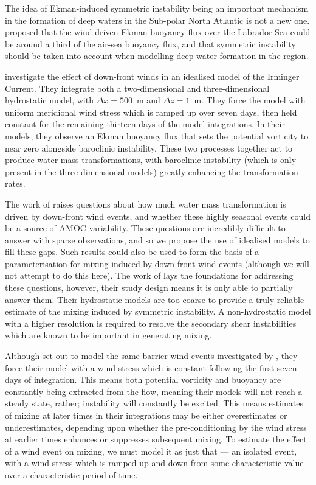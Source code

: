 The idea of Ekman-induced symmetric instability being an important mechanism in the formation of deep waters in the Sub-polar North Atlantic is not a new one. \citet{Straneo2002} proposed that the wind-driven Ekman buoyancy flux over the Labrador Sea could be around a third of the air-sea buoyancy flux, and that symmetric instability should be taken into account when modelling deep water formation in the region. 

\citet{Spall2016} investigate the effect of down-front winds in an idealised model of the Irminger Current. They integrate both a two-dimensional and three-dimensional hydrostatic model, with $\Delta x = 500$~m and $\Delta z = 1$~m. They force the model with uniform meridional wind stress which is ramped up over seven days, then held constant for the remaining thirteen days of the model integrations. In their models, they observe an Ekman buoyancy flux that sets the potential vorticity to near zero alongside baroclinic instability. These two processes together act to produce water mass transformations, with baroclinic instability (which is only present in the three-dimensional models) greatly enhancing the transformation rates.

The work of \citet{LeBras2022} raises questions about how much water mass transformation is driven by down-front wind events, and whether these highly seasonal events could be a source of AMOC variability. These questions are incredibly difficult to answer with sparse observations, and so we propose the use of idealised models to fill these gaps. Such results could also be used to form the basis of a parameterisation for mixing induced by down-front wind events (although we will not attempt to do this here). The work of \citet{Spall2016} lays the foundations for addressing these questions, however, their study design means it is only able to partially answer them. Their hydrostatic models are too coarse to provide a truly reliable estimate of the mixing induced by symmetric instability. A non-hydrostatic model with a higher resolution is required to resolve the secondary shear instabilities which are known to be important in generating mixing.

Although \citet{Spall2016} set out to model the same barrier wind events investigated by \citet{LeBras2022}, they force their model with a wind stress which is constant following the first seven days of integration. This means both potential vorticity and buoyancy are constantly being extracted from the flow, meaning their models will not reach a steady state, rather; instability will constantly be excited. This means estimates of mixing at later times in their integrations may be either overestimates or underestimates, depending upon whether the pre-conditioning by the wind stress at earlier times enhances or suppresses subsequent mixing. To estimate the effect of a wind event on mixing, we must model it as just that --- an isolated event, with a wind stress which is ramped up and down from some characteristic value over a characteristic period of time.

